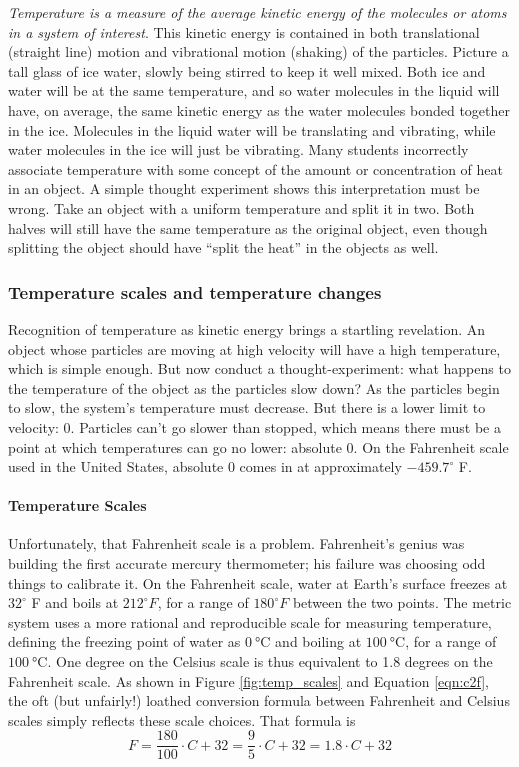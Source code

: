 \documentclass[amstex,12pt]{book}
\begin{document}
\emph{Temperature is a measure of the average kinetic energy of the molecules or atoms in a system of interest}. This kinetic energy is contained in both translational (straight line) motion and vibrational motion (shaking) of the particles. Picture a tall glass of ice water, slowly being stirred to keep it well mixed. Both ice and water will be at the same temperature, and so water molecules in the liquid will have, on average, the same kinetic energy as the water molecules bonded together in the ice. Molecules in the liquid water will be translating and vibrating, while water molecules in the ice will just be vibrating. Many students incorrectly associate temperature with some concept of the amount or concentration of heat in an object. A simple thought experiment shows this interpretation must be wrong. Take an object with a uniform temperature and split it in two. Both halves will still have the same temperature as the original object, even though splitting the object should have ``split the heat'' in the objects as well. 

\subsubsection{Temperature scales and temperature changes}
Recognition of temperature as kinetic energy brings a startling revelation. An object whose particles are moving at high velocity will have a high temperature, which is simple enough. But now conduct a thought-experiment: what happens to the temperature of the object as the particles slow down? As the particles begin to slow, the system's temperature must decrease. But there is a lower limit to velocity: 0. Particles can't go slower than stopped, which means there must be a point at which temperatures can go no lower: absolute 0. On the Fahrenheit scale used in the United States, absolute 0 comes in at approximately $-459.7^{\circ}$ F.

\paragraph{Temperature Scales}
Unfortunately, that Fahrenheit scale is a problem. Fahrenheit's genius was building the first accurate mercury thermometer; his failure was choosing odd things to calibrate it. On the Fahrenheit scale, water at Earth's surface freezes at $32^{\circ}$ F and boils at $212^{\circ} F$, for a range of $180^{\circ} F$ between the two points. The metric system uses a more rational and reproducible scale for measuring temperature, defining the freezing point of water as $\SI{0}{\degreeCelsius}$ and boiling at $\SI{100}{\degreeCelsius}$, for a range of $\SI{100}{\degreeCelsius}$. One degree on the Celsius scale is thus equivalent to 1.8 degrees on the Fahrenheit scale. As shown in Figure \ref{fig:temp_scales} and Equation \ref{eqn:c2f}, the oft (but unfairly!) loathed conversion formula between Fahrenheit and Celsius scales simply reflects these scale choices. That formula is 
	\begin{equation}
	\label{eqn:c2f}
	F=\frac{180}{100}\cdot  C+ 32=\frac{9}{5}\cdot C+ 32=1.8\cdot C+ 32
	\end{equation}
	
\end{document}
